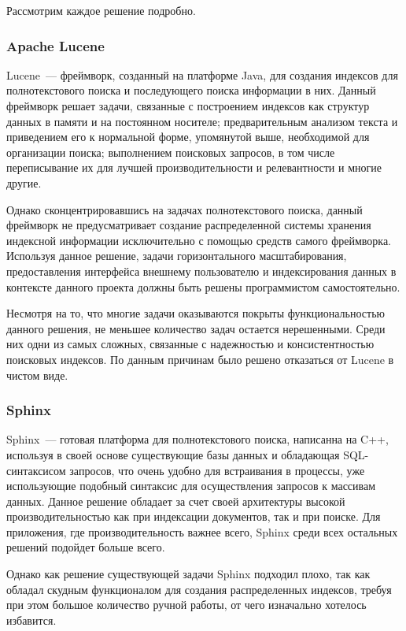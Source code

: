 Рассмотрим каждое решение подробно.

\subsubsection{Apache Lucene}

Lucene~--- фреймворк, созданный на платформе Java, для создания индексов для полнотекстового поиска и последующего поиска информации в них. Данный фреймворк решает задачи, связанные с построением индексов как структур данных в памяти и на постоянном носителе; предварительным анализом текста и приведением его к нормальной форме, упомянутой выше, необходимой для организации поиска; выполнением поисковых запросов, в том числе переписывание их для лучшей производительности и релевантности и многие другие.

Однако сконцентрировавшись на задачах полнотекстового поиска, данный фреймворк не предусматривает создание распределенной системы хранения индексной информации исключительно с помощью средств самого фреймворка. Используя данное решение, задачи горизонтального масштабирования, предоставления интерфейса внешнему пользователю и индексирования данных в контексте данного проекта должны быть решены программистом самостоятельно.

Несмотря на то, что многие задачи оказываются покрыты функциональностью данного решения, не меньшее количество задач остается нерешенными. Среди них одни из самых сложных, связанные с надежностью и консистентностью поисковых индексов. По данным причинам было решено отказаться от Lucene в чистом виде.

\subsubsection{Sphinx}

Sphinx~--- готовая платформа для полнотекстового поиска, написанна на C++, используя в своей основе существующие базы данных и обладающая SQL-синтаксисом запросов, что очень удобно для встраивания в процессы, уже использующие подобный синтаксис для осуществления запросов к массивам данных. Данное решение обладает за счет своей архитектуры высокой производительностью как при индексации документов, так и при поиске. Для приложения, где производительность важнее всего, Sphinx среди всех остальных решений подойдет больше всего.

Однако как решение существующей задачи Sphinx подходил плохо, так как обладал скудным функционалом для создания распределенных индексов, требуя при этом большое количество ручной работы, от чего изначально хотелось избавится.

